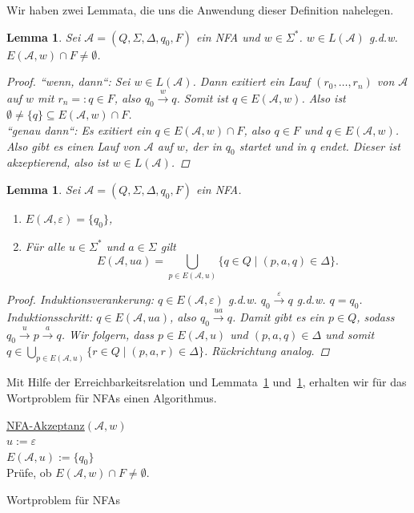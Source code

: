 \documentclass[11pt, a4paper]{article}
\theoremstyle{definition}
\theoremstyle{plain}
\newtheorem{lemma}[definition]{Lemma}
\numberwithin{equation}{section}
\newcommand{\reaches}[1]{\overset{#1}{\rightarrow}}
\begin{document}
Wir haben zwei Lemmata, die uns die Anwendung dieser Definition nahelegen.
\begin{lemma}\label{lem:reach1}
	Sei \( \mathcal{A} = (Q, \Sigma, \Delta, q_0, F)\) ein NFA und \( w \in \Sigma^\ast \). \( w \in L(\mathcal{A}) \) {g.d.w.} \( E(\mathcal{A}, w) \cap F \neq \emptyset \).
	\begin{proof}
		``wenn, dann``: Sei \( w \in L(\mathcal{A}) \). Dann exitiert ein Lauf \( (r_0, \ldots, r_n) \) von \( \mathcal{A} \) auf \( w \) mit \( r_n =: q \in F \), also \( q_0 \reaches{w} q \). Somit ist \( q \in E(\mathcal{A}, w) \). Also ist \( \emptyset \neq \{q\} \subseteq E(\mathcal{A}, w) \cap F \).\\
		``genau dann``: Es exitiert ein \( q \in E(\mathcal{A}, w) \cap F \), also \( q \in F \) und \( q \in E(\mathcal{A}, w) \). Also gibt es einen Lauf von \( \mathcal{A} \) auf \( w \), der in \( q_0 \) startet und in \( q \) endet. Dieser ist akzeptierend, also ist \( w \in L(\mathcal{A}) \).
	\end{proof}
\end{lemma}
\begin{lemma}\label{lem:reach2}
	Sei \( \mathcal{A} = (Q, \Sigma, \Delta, q_0, F) \) ein NFA.
	\begin{enumerate}
		\item \( E(\mathcal{A}, \varepsilon) = \{q_0\} \),
		\item Für alle \( u \in \Sigma^\ast \) und \( a \in \Sigma \) gilt
			\[
				E(\mathcal{A}, ua) = \bigcup_{p \in E(\mathcal{A}, u)} \{ q \in Q \mid (p, a, q) \in \Delta \}.
			\]
	\end{enumerate}
	\begin{proof}
		Induktionsverankerung: \( q \in E(\mathcal{A}, \varepsilon) \) {g.d.w.} \( q_0 \reaches{\varepsilon} q \) {g.d.w.} \( q = q_0 \). \checkmark\\
		Induktionsschritt: \( q \in E(\mathcal{A}, ua) \), also \( q_0 \reaches{ua} q \). Damit gibt es ein \( p \in Q \), sodass \( q_0 \reaches{u} p \reaches{a} q \). Wir folgern, dass \( p \in E(\mathcal{A}, u) \) und \( (p, a, q) \in \Delta \) und somit \( q \in \bigcup_{p \in E(\mathcal{A}, u)} \{ r \in Q \mid (p, a, r) \in \Delta \} \). Rückrichtung analog.
	\end{proof}
\end{lemma}
Mit Hilfe der Erreichbarkeitsrelation und Lemmata~\ref{lem:reach1} und~\ref{lem:reach2}, erhalten wir für das Wortproblem für NFAs einen Algorithmus.
\begin{algorithm}
	\underline{NFA-Akzeptanz}{$(\mathcal{A}, w)$}\\
	$u := \varepsilon$\\
	$E(\mathcal{A}, u) := \{ q_0 \}$\\	
	Prüfe, ob $E(\mathcal{A}, w) \cap F \neq \emptyset$.
	\caption{Wortproblem für NFAs}
	\label{alg:nfaacc}
\end{algorithm}
\end{document}
